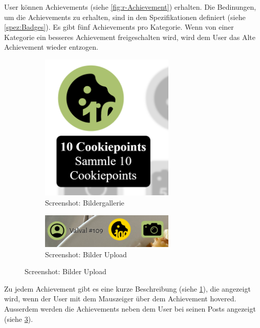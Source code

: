 User können Achievements (siehe \ref{fig:r-Achievement}) erhalten. Die Bedinungen, um die Achievements zu
erhalten, sind in den Spezifikationen definiert (siehe \ref{spez:Badges}). Es
gibt fünf Achievements pro Kategorie. Wenn von einer Kategorie ein besseres
Achievement freigeschalten wird, wird dem User das Alte Achievement wieder
entzogen.

\begin{figure}[htp]
    \begin{subfigure}[b]{0.5\textwidth}
        \centering
        \includegraphics[width=0.7\textwidth]{images/Resultat-Beschreibung.png}
        \caption{Screenshot: Bildergallerie}
        \label{fig:r-Achievement-beschreibung}
    \end{subfigure}
    \begin{subfigure}[b]{0.5\textwidth}
        \centering
        \includegraphics[width=0.7\textwidth]{images/Resultat-Username.png}
        \caption{Screenshot: Bilder Upload}
        \label{fig:r-username-display}
    \end{subfigure}
    \hfill
\end{figure}

Zu jedem Achievement gibt es eine kurze Beschreibung (siehe
\ref{fig:r-Achievement-beschreibung}), die angezeigt wird, wenn der User mit dem
Mauszeiger über dem Achievement hovered. Ausserdem werden die Achievements neben
dem User bei seinen Posts angezeigt (siehe \ref{fig:r-username-display}).

